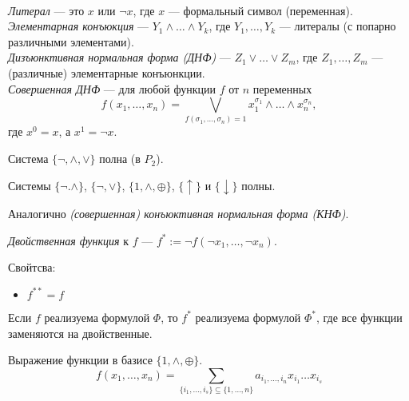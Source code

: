 \documentclass[12pt,a4paper]{article}
\begin{document}
    \begin{definition}\ \\
        \emph{Литерал} --- это $x$ или $\neg x$, где $x$ --- формальный символ (переменная).\\
        \emph{Элементарная конъюкция} --- $Y_1 \wedge \dots \wedge Y_k$, где $Y_1, \dots, Y_k$ --- литералы (с попарно различными элементами).\\
        \emph{Дизъюнктивная нормальная форма (ДНФ)} --- $Z_1 \vee \dots \vee Z_m$, где $Z_1, \dots, Z_m$ --- (различные) элементарные конъюнкции.\\
        \emph{Совершенная ДНФ} --- для любой функции $f$ от $n$ переменных \[f(x_1, \dots, x_n)=\bigvee_{f(\sigma_1, \dots, \sigma_n)=1} x_1^{\sigma_1} \wedge \dots \wedge x_n^{\sigma_n},\]
        где $x^0 = x$, а $x^1 = \neg x$.
    \end{definition}

    \begin{statement}
        Система $\{\neg, \wedge, \vee\}$ полна (в $P_2$).
    \end{statement}

    \begin{corollary}
        Системы $\{\neg. \wedge\}$, $\{\neg, \vee\}$, $\{1, \wedge, \oplus\}$, $\{\uparrow\}$ и $\{\downarrow\}$ полны.
    \end{corollary}

    \begin{definition}
        Аналогично \emph{(совершенная) конъюктивная нормальная форма (КНФ)}.
    \end{definition}

    \begin{definition}
        \emph{Двойственная функция} к $f$ --- $f^* := \neg f(\neg x_1, \dots, \neg x_n)$.
    \end{definition}

    Свойтсва:
    \begin{itemize}
        \item $f^{**} = f$
    \end{itemize}

    \begin{statement}
        Если $f$ реализуема формулой $\Phi$, то $f^*$ реализуема формулой $\Phi^*$, где все функции заменяются на двойственные.
    \end{statement}

    \begin{definition}
        Выражение функции в базисе $\{1, \wedge, \oplus\}$.\\
        \[
            f(x_1, \dots, x_n) = \sum_{\{i_1, \dots, i_s\}\subseteq\{1, \dots, n\}} a_{i_1, \dots, i_n} x_{i_1} \dots x_{i_s}
        \]
    \end{definition}
\end{document}
